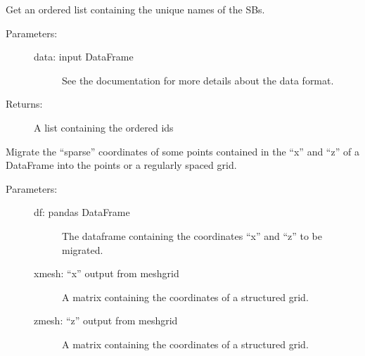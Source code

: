 \documentclass[letterpaper,10pt,english]{sphinxmanual}
\begin{document}

\begin{fulllineitems}
\label{\detokenize{hiegeo:hiegeo.get_unique_sb_name}}
Get an ordered list containing the unique names of the 
SBs.
\begin{description}
\item[{Parameters:}] \leavevmode\begin{description}
\item[{data: input DataFrame}] \leavevmode
See the documentation for more details about the data format.

\end{description}

\item[{Returns:}] \leavevmode
A list containing the ordered ids

\end{description}

\end{fulllineitems}


\begin{fulllineitems}
\label{\detokenize{hiegeo:hiegeo.migrate}}
Migrate the “sparse” coordinates of some points contained in the “x” and
“z” of a DataFrame into the points or a regularly spaced grid.
\begin{description}
\item[{Parameters:}] \leavevmode\begin{description}
\item[{df: pandas DataFrame}] \leavevmode
The dataframe containing the coordinates “x” and “z” to be migrated.

\item[{xmesh: “x” output from meshgrid}] \leavevmode
A matrix containing the  coordinates of a structured grid.

\item[{zmesh: “z” output from meshgrid}] \leavevmode
A matrix containing the  coordinates of a structured grid.

\end{description}

\end{description}

\end{fulllineitems}
\end{document}
